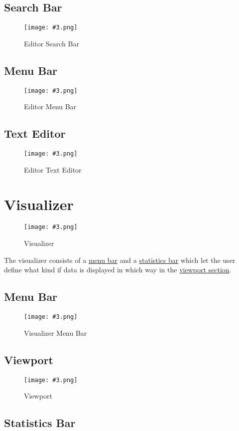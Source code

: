 \documentclass[10pt,a4paper]{report}
\newcommand{\refer}[2]{\hyperref[#1]{\textcolor{col:reference}{#2}}}
\newcommand{\h}[1]{\textcolor{col:highlight}{#1}}
\newcommand{\includeimage}[5]{
    \begin{figure}[H]
        #1
        \texttt{[image: \#3.png]}
        \caption{#4}
        \label{fig:#5}
    \end{figure}
}
\begin{document}
\subsection{Search Bar}
\label{sec:editor:search}

\includeimage{}{0.4}{Editor Search Bar}{Editor Search Bar}{editor_search_bar}

\subsection{Menu Bar}
\label{sec:editor:menu}

\includeimage{}{0.4}{Editor Menu Bar}{Editor Menu Bar}{editor_menu_bar}

\subsection{Text Editor}
\label{sec:editor:text_editor}

\includeimage{}{0.4}{Editor Text Editor}{Editor Text Editor}{editor_text_editor}

\section{Visualizer}
\includeimage{}{0.4}{Visualizer}{Visualizer}{visualizer}
\label{sec:visualizer}
The \h{visualizer} consists of a \refer{sec:visualizer:menu}{menu bar} and a \refer{sec:visualizer:statistics}{statistics bar} which let the user define what kind if data is displayed in which way in the \refer{sec:visualizer:viewport}{viewport section}.


\subsection{Menu Bar}
\label{sec:visualizer:menu}

\includeimage{}{0.4}{Visualizer Menu Bar}{Visualizer Menu Bar}{visualizer_menu_bar}

\subsection{Viewport}
\label{sec:visualizer:viewport}

\includeimage{}{0.4}{Viewport}{Viewport}{viewport}

\subsection{Statistics Bar}
\label{sec:visualizer:statistics}
\end{document}
